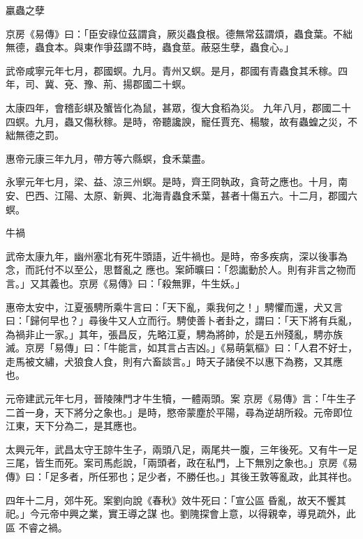 \begin{pinyinscope}
 臝蟲之孽



 京房《易傳》曰：「臣安祿位茲謂貪，厥災蟲食根。德無常茲謂煩，蟲食葉。不絀無德，蟲食本。與東作爭茲謂不時，蟲食莖。蔽惡生孽，蟲食心。」



 武帝咸寧元年七月，郡國螟。九月。青州又螟。是月，郡國有青蟲食其禾稼。四年，司、冀、兗、豫、荊、揚郡國二十螟。



 太康四年，會稽彭蜞及蟹皆化為鼠，甚眾，復大食稻為災。
 九年八月，郡國二十四螟。九月，蟲又傷秋稼。是時，帝聽讒諛，寵任賈充、楊駿，故有蟲蝗之災，不絀無德之罰。



 惠帝元康三年九月，帶方等六縣螟，食禾葉盡。



 永寧元年七月，梁、益、涼三州螟。是時，齊王冏執政，貪苛之應也。十月，南安、巴西、江陽、太原、新興、北海青蟲食禾葉，甚者十傷五六。十二月，郡國六螟。



 牛禍



 武帝太康九年，幽州塞北有死牛頭語，近牛禍也。是時，帝多疾病，深以後事為念，而託付不以至公，思瞀亂之
 應也。案師曠曰：「怨讟動於人。則有非言之物而言。」又其義也。京房《易傳》曰：「殺無罪，牛生妖。」



 惠帝太安中，江夏張騁所乘牛言曰：「天下亂，乘我何之！」騁懼而還，犬又言曰：「歸何早也？」尋後牛又人立而行。騁使善卜者卦之，謂曰：「天下將有兵亂，為禍非止一家。」其年，張昌反，先略江夏，騁為將帥，於是五州殘亂，騁亦族滅。京房「易傳」曰：「牛能言，如其言占吉凶。」《易萌氣樞》曰：「人君不好士，走馬被文繡，犬狼食人食，則有六畜談言。」時天子諸侯不以惠下為務，又其應也。



 元帝建武元年七月，晉陵陳門才牛生犢，一體兩頭。案
 京房《易傳》言：「牛生子二首一身，天下將分之象也。」是時，愍帝蒙塵於平陽，尋為逆胡所殺。元帝即位江東，天下分為二，是其應也。



 太興元年，武昌太守王諒牛生子，兩頭八足，兩尾共一腹，三年後死。又有牛一足三尾，皆生而死。案司馬彪說，「兩頭者，政在私門，上下無別之象也。」京房《易傳》曰：「足多者，所任邪也；足少者，不勝任也。」其後王敦等亂政，此其祥也。


四年十二月，郊牛死。案劉向說《春秋》效牛死曰：「宣公區
 昏亂，故天不饗其祀。」今元帝中興之業，實王導之謀
 也。劉隗探會上意，以得親幸，導見疏外，此區
 不睿之禍。




\end{pinyinscope}
